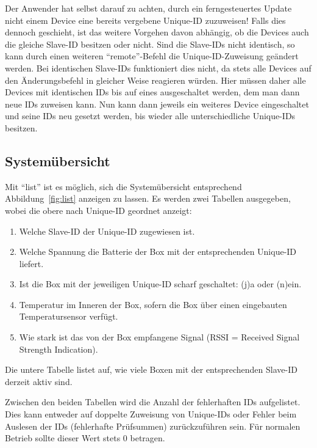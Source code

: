 \documentclass[pdftex, parskip, numbers=noenddot, toc=listof]{scrbook}
\begin{document}
	Der Anwender hat selbst darauf zu achten, durch ein ferngesteuertes Update nicht einem Device eine bereits vergebene Unique-ID zuzuweisen! Falls dies dennoch geschieht, ist das weitere Vorgehen davon abhängig, ob die Devices auch die gleiche Slave-ID besitzen oder nicht. Sind die Slave-IDs nicht identisch, so kann durch einen weiteren \enquote{remote}-Befehl die Unique-ID-Zuweisung geändert werden. Bei identischen Slave-IDs funktioniert dies nicht, da stets alle Devices auf den Änderungsbefehl in gleicher Weise reagieren würden. Hier müssen daher alle Devices mit identischen IDs bis auf eines ausgeschaltet werden, dem man dann neue IDs zuweisen kann. Nun kann dann jeweils ein weiteres Device eingeschaltet und seine IDs neu gesetzt werden, bis wieder alle unterschiedliche Unique-IDs besitzen.

	\subsection{Systemübersicht}
	\label{sec:list}

	Mit \enquote{list} ist es möglich, sich die Systemübersicht entsprechend Abbildung~\ref{fig:list} anzeigen zu lassen. Es werden zwei Tabellen ausgegeben, wobei die obere nach Unique-ID geordnet anzeigt:
	\begin{enumerate}
		\item Welche Slave-ID der Unique-ID zugewiesen ist.
		\item Welche Spannung die Batterie der Box mit der entsprechenden Unique-ID liefert.
		\item Ist die Box mit der jeweiligen Unique-ID scharf geschaltet: (j)a oder (n)ein.
		\item Temperatur im Inneren der Box, sofern die Box über einen eingebauten Temperatursensor verfügt.
		\item Wie stark ist das von der Box empfangene Signal (RSSI = Received Signal Strength Indication).
	\end{enumerate}

	Die untere Tabelle listet auf, wie viele Boxen mit der entsprechenden Slave-ID derzeit aktiv sind.

	Zwischen den beiden Tabellen wird die Anzahl der fehlerhaften IDs aufgelistet. Dies kann entweder auf doppelte Zuweisung von Unique-IDs oder Fehler beim Auslesen der IDs (fehlerhafte Prüfsummen) zurückzuführen sein. Für normalen Betrieb sollte dieser Wert stets 0 betragen.
\end{document}

